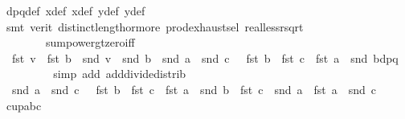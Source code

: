 \begin{isabellebody}
\ dpq{\isacharunderscore}{\kern0pt}def\ x{}{\isacharunderscore}{\kern0pt}def\ x{}{\isacharunderscore}{\kern0pt}def\ y{}{\isacharunderscore}{\kern0pt}def\ y{}{\isacharunderscore}{\kern0pt}def\ \isanewline
\ \ \ \ \isamarkupfalse%
\ {\isacharparenleft}{\kern0pt}smt\ {\isacharparenleft}{\kern0pt}verit{\isacharparenright}{\kern0pt}\ distinct{\isacharunderscore}{\kern0pt}length{\isacharunderscore}{\kern0pt}{}{\isacharunderscore}{\kern0pt}or{\isacharunderscore}{\kern0pt}more\ prod{\isachardot}{\kern0pt}exhaust{\isacharunderscore}{\kern0pt}sel\ real{\isacharunderscore}{\kern0pt}less{\isacharunderscore}{\kern0pt}rsqrt\isanewline
\ \ \ \ \ \ \ \ sum{\isacharunderscore}{\kern0pt}power{}{\isacharunderscore}{\kern0pt}gt{\isacharunderscore}{\kern0pt}zero{\isacharunderscore}{\kern0pt}iff{\isacharparenright}{\kern0pt}\isanewline
\ \ \isamarkupfalse%
\ {}{\isacharcolon}{\kern0pt}\ {\isachardoublequoteopen}fst\ v\ {\isasymbullet}\ fst\ b\ {\isacharplus}{\kern0pt}\ snd\ v\ {\isasymbullet}\ snd\ b\ {\isacharequal}{\kern0pt}\ {\isacharparenleft}{\kern0pt}{\isacharparenleft}{\kern0pt}snd\ a\ {\isacharminus}{\kern0pt}\ snd\ c{\isacharparenright}{\kern0pt}\ {\isacharasterisk}{\kern0pt}\ \ fst\ b\ {\isacharplus}{\kern0pt}\ {\isacharparenleft}{\kern0pt}fst\ c\ {\isacharminus}{\kern0pt}\ fst\ a{\isacharparenright}{\kern0pt}\ {\isacharasterisk}{\kern0pt}\ snd\ b{\isacharparenright}{\kern0pt}{\isacharslash}{\kern0pt}dpq{\isachardoublequoteclose}\isanewline
\ \ \ \ \isamarkupfalse%
\ {}\ {}\ \isamarkupfalse%
\ {\isacharparenleft}{\kern0pt}simp\ add{\isacharcolon}{\kern0pt}\ add{\isacharunderscore}{\kern0pt}divide{\isacharunderscore}{\kern0pt}distrib{\isacharparenright}{\kern0pt}\isanewline
\ \ \isamarkupfalse%
\ {}{\isacharcolon}{\kern0pt}\ {\isachardoublequoteopen}{\isacharparenleft}{\kern0pt}snd\ a\ {\isacharminus}{\kern0pt}\ snd\ c{\isacharparenright}{\kern0pt}\ {\isacharasterisk}{\kern0pt}\ \ fst\ b\ {\isacharplus}{\kern0pt}\ {\isacharparenleft}{\kern0pt}fst\ c\ {\isacharminus}{\kern0pt}\ fst\ a{\isacharparenright}{\kern0pt}\ {\isacharasterisk}{\kern0pt}\ snd\ b\ {\isacharless}{\kern0pt}\ fst\ c\ {\isacharasterisk}{\kern0pt}\ snd\ a\ {\isacharminus}{\kern0pt}\ fst\ a\ {\isacharasterisk}{\kern0pt}\ snd\ c{\isachardoublequoteclose}\isanewline
\ \ \ \ \isamarkupfalse%
\ cup{\isacharunderscore}{\kern0pt}abc\ \isamarkupfalse%

\end{isabellebody}
